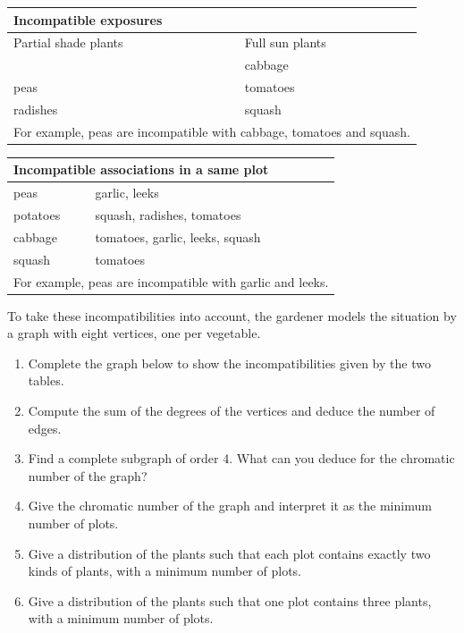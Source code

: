 \medskip
\begin{minipage}[t]{0.46\textwidth}
\begin{tabular}{|l|l|}\hline
\multicolumn{2}{|p{6.5cm}|}{Incompatible exposures}\\ \hline
\multicolumn{1}{|p{3cm}|}{Partial shade plants}
  & \multicolumn{1}{|p{3cm}|}{Full sun plants}\\ \hline
        & cabbage \\
peas    & tomatoes \\
radishes& squash \\ \hline
\multicolumn{2}{|p{6.5cm}|}{For example, peas are incompatible with
cabbage, tomatoes and squash.}\\ \hline
\end{tabular}
\end{minipage}
\hfill
\begin{minipage}[t]{0.46\textwidth}
\begin{tabular}{|l|l|}\hline
\multicolumn{2}{|p{6.5cm}|}{Incompatible associations in a same plot}\\
\hline
peas     & garlic, leeks\\ \hline
potatoes & squash, radishes, tomatoes\\ \hline
cabbage  & tomatoes, garlic, leeks, squash\\ \hline
squash   & tomatoes\\ \hline
\multicolumn{2}{|p{6.5cm}|}{For example, peas are incompatible with
garlic and leeks.}\\ \hline
\end{tabular}
\end{minipage}

\medskip
To take these incompatibilities into account, the gardener models the
situation by a graph with eight vertices, one per vegetable.

\begin{enumerate}
\item Complete the graph below to show the incompatibilities given by the
      two tables.
\item Compute the sum of the degrees of the vertices and deduce the number
      of edges.
\item Find a complete subgraph of order 4. What can you deduce for the
      chromatic number of the graph?
\item Give the chromatic number of the graph and interpret it as the
      minimum number of plots.
\item Give a distribution of the plants such that each plot contains
      exactly two kinds of plants, with a minimum number of plots.
\item Give a distribution of the plants such that one plot contains three
      plants, with a minimum number of plots.
\end{enumerate}

